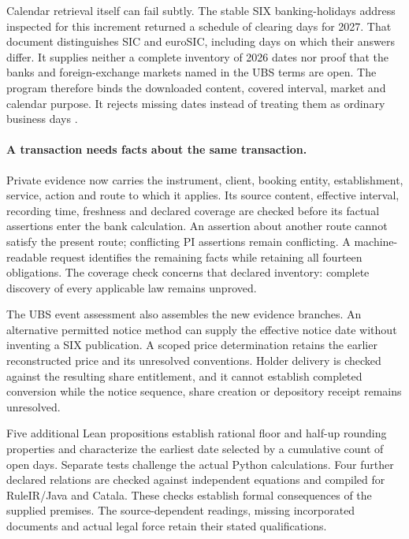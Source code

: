 \documentclass[12pt,a4paper,oneside,openany]{book}
\begin{document}
Calendar retrieval itself can fail subtly. The stable SIX banking-holidays
address inspected for this increment returned a schedule of clearing days
for 2027. That document distinguishes SIC and euroSIC, including days on
which their answers differ. It supplies neither a complete inventory of
2026 dates nor proof that the banks and foreign-exchange markets named in
the UBS terms are open. The program therefore binds the downloaded content,
covered interval, market and calendar purpose. It rejects missing dates
instead of treating them as ordinary business days
\citep[one-page schedule]{sixclearing2027}.

\paragraph{A transaction needs facts about the same transaction.}
Private evidence now carries the instrument, client, booking entity,
establishment, service, action and route to which it applies. Its source
content, effective interval, recording time, freshness and declared coverage
are checked before its factual assertions enter the bank calculation.
An assertion about another route cannot satisfy the present route; conflicting
PI assertions remain conflicting. A machine-readable request identifies the
remaining facts while retaining all fourteen obligations. The coverage check
concerns that declared inventory: complete discovery of every applicable law
remains unproved.

The UBS event assessment also assembles the new evidence branches. An
alternative permitted notice method can supply the effective notice date
without inventing a SIX publication. A scoped price determination retains
the earlier reconstructed price and its unresolved conventions. Holder
delivery is checked against the resulting share entitlement, and it cannot
establish completed conversion while the notice sequence, share creation or
depository receipt remains unresolved.

Five additional Lean propositions establish rational floor and half-up
rounding properties and characterize the earliest date selected by a
cumulative count of open days. Separate tests challenge the actual Python
calculations. Four further declared relations are checked against independent
equations and compiled for RuleIR/Java and Catala. These checks establish
formal consequences of the supplied premises. The source-dependent readings,
missing incorporated documents and actual legal force retain their stated
qualifications.
\end{document}
